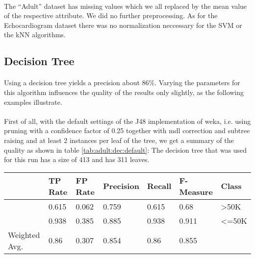 \documentclass[paper=a4, fontsize=11pt]{scrartcl} %
\numberwithin{equation}{section} %
\numberwithin{figure}{section} %
\numberwithin{table}{section} %
\begin{document}
\paragraph{}The ``Adult'' dataset has missing values which we all replaced by the mean value of the respective attribute. We did no further preprocessing. As for the Echocardiogram dataset there was no normalization neccessary for the SVM or the kNN algorithms.


\subsection{Decision Tree}
\paragraph{}Using a decision tree yields a precision about 86\%. Varying the parameters for this algorithm influences the quality of the results only slightly, as the following examples illustrate.

\paragraph{}First of all, with the default settings of the J48 implementation of weka, i.e. using pruning with a confidence factor of 0.25 together with mdl correction and subtree raising and at least 2 instances per leaf of the tree, we get a summary of the quality as shown in table \ref{tab:adult:dec:default}:
The decision tree that was used for this run has a size of 413 and has 311 leaves.

\begin{table*}[htb]\centering
    \begin{tabular*}{\columnwidth}{@{}lllllll@{}}
        \toprule 
               & TP Rate & FP Rate & Precision & Recall &  F-Measure &  Class \\ \midrule  
               & 0.615   & 0.062   & 0.759     & 0.615  &  0.68      &  >50K  \\  
               & 0.938   & 0.385   & 0.885     & 0.938  &  0.911     &  <=50K \\  
Weighted Avg.  & 0.86    & 0.307   & 0.854     & 0.86   &  0.855     &        \\  \bottomrule 
    \end{tabular*}
\caption{Decision Tree -- Default Settings} 
\label{tab:adult:dec:default}
\end{table*}
\FloatBarrier
\end{document}
